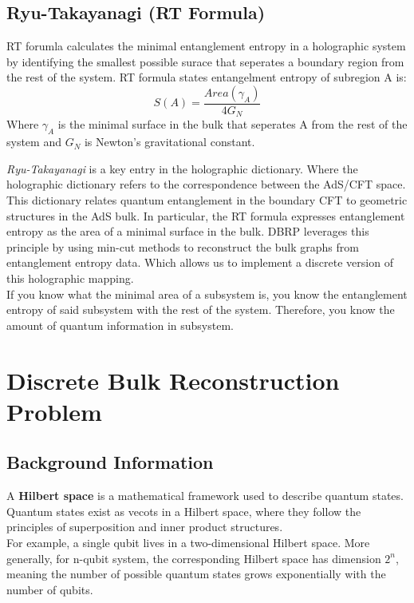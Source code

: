\documentclass[12pt]{article}
\begin{document}
    \subsection{Ryu-Takayanagi (RT Formula)}
        \hspace{0.5cm} RT forumla calculates the minimal entanglement entropy in a holographic system by identifying the smallest possible surace that seperates a boundary region from the rest of the system. RT formula states entangelment entropy of subregion A is:
        \[
            S(A) = \frac{Area(\gamma_A)}{4G_N}
        \]
        \hspace{0.5cm}Where $\gamma_A$ is the minimal surface in the bulk that seperates A from the rest of the system and $G_N$ is Newton's gravitational constant.
        \\
        \vspace{0.3cm}

        \hspace{0.5cm} \textit{Ryu-Takayanagi} is a key entry in the holographic dictionary. Where the holographic dictionary refers to the correspondence between the AdS/CFT space. This dictionary relates quantum entanglement in the boundary CFT to geometric structures in the AdS bulk. In particular, the RT formula expresses entanglement entropy as the area of a minimal surface in the bulk. DBRP leverages this principle by using min-cut methods to reconstruct the bulk graphs from entanglement entropy data. Which allows us to implement a discrete version of this holographic mapping.
        \\

        \hspace{0.5cm} If you know what the minimal area of a subsystem is, you know the entanglement entropy of said subsystem with the rest of the system. Therefore, you know the amount of quantum information in subsystem.

\section{Discrete Bulk Reconstruction Problem}
\subsection{Background Information}
    \hspace{0.5cm}A \textbf{Hilbert space} is a mathematical framework used to describe quantum states. Quantum states exist as vecots in a Hilbert space, where they follow the principles of superposition and inner product structures.
    \\
    For example, a single qubit lives in a two-dimensional Hilbert space. More generally, for n-qubit system, the corresponding Hilbert space has dimension $2^n$, meaning the number of possible quantum states grows exponentially with the number of qubits.
    
\end{document}
